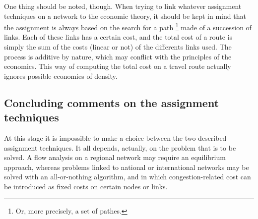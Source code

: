 One thing should be noted, though. When trying to link whatever assignment
techniques on a network to the economic theory, it should be kept in mind that
the assignment is always based on the search for a path \footnote {Or, more
precisely, a set of pathes.} made of a succession of links.  Each of these links
has a certain cost, and the total cost of a route is simply the sum of the costs
(linear or not) of the differents links used.  The process is additive by
nature, which may conflict with the principles of the economics.  This way of
computing the total cost on a travel route actually ignores possible economies
of density.


\subsection{Concluding comments on the assignment techniques}


At this stage it is impossible to make a choice between the two described
assignment techniques. It all depends, actually, on the problem that is to be solved. A
flow analysis on a regional network may require an equilibrium approach,
whereas problems linked to national or international networks may be solved with an all-or-nothing algorithm, and in which congestion-related cost can be introduced as fixed costs on certain nodes or links.
